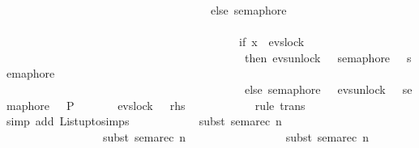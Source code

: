 \begin{isabellebody}
\ \ \ \ \ \ \ \ \ \ \ \ \ \ \ \ \ \ \ \ \ \ \ \ \ \ \ \ \ \ \ \ \ \ \ \ else\ semaphore\ {}\ \isanewline
\ \ \ \ \ \ \ \ \ \ \ \ \ \ \ \ \ \ \ \ \ \ \ \ \ \ \ \ \ \ \ \ \ \ \ \ \ \ \ \ \ {\isacharbar}{\kern0pt}{\isacharbar}{\kern0pt}{\isacharbar}{\kern0pt}\ \isanewline
\ \ \ \ \ \ \ \ \ \ \ \ \ \ \ \ \ \ \ \ \ \ \ \ \ \ \ \ \ \ \ \ \ \ \ \ \ \ \ \ \ {\isacharparenleft}{\kern0pt}if\ x\ {\isacharequal}{\kern0pt}\ evs{\isachardot}{\kern0pt}lock\ {}\ \isanewline
\ \ \ \ \ \ \ \ \ \ \ \ \ \ \ \ \ \ \ \ \ \ \ \ \ \ \ \ \ \ \ \ \ \ \ \ \ \ \ \ \ \ then\ evs{\isachardot}{\kern0pt}unlock\ {}\ {\isasymrightarrow}\ semaphore\ {}\ {\isacharbar}{\kern0pt}{\isacharbar}{\kern0pt}{\isacharbar}{\kern0pt}\ semaphore\ {}\isanewline
\ \ \ \ \ \ \ \ \ \ \ \ \ \ \ \ \ \ \ \ \ \ \ \ \ \ \ \ \ \ \ \ \ \ \ \ \ \ \ \ \ \ else\ semaphore\ {}\ {\isacharbar}{\kern0pt}{\isacharbar}{\kern0pt}{\isacharbar}{\kern0pt}\ evs{\isachardot}{\kern0pt}unlock\ {}\ {\isasymrightarrow}\ semaphore\ {}{\isacharparenright}{\kern0pt}{\isacharparenright}{\kern0pt}{\isacharparenright}{\kern0pt}\ {\isacharbar}{\kern0pt}{\isacharbar}{\kern0pt}\ P{\isacharparenright}{\kern0pt}{\isachardoublequoteclose}\isanewline
\ \ \ \ {\isacharparenleft}{\kern0pt}\ {\isachardoublequoteopen}{\isacharunderscore}{\kern0pt}\ {\isacharequal}{\kern0pt}\ evs{\isachardot}{\kern0pt}lock\ {}\ {\isasymrightarrow}\ {\isacharquery}{\kern0pt}rhs{\isacharprime}{\kern0pt}{\isachardoublequoteclose}{\isacharparenright}{\kern0pt}\isanewline
\ \ \ \ \ \ \ \ \ \ \ \isamarkupfalse%
{\isacharparenleft}{\kern0pt}rule\ trans{\isacharparenright}{\kern0pt}\isanewline
\ \ \ \ \ \ \ \ \ \ \ \isamarkupfalse%
{\isacharparenleft}{\kern0pt}simp\ add{\isacharcolon}{\kern0pt}\ List{\isachardot}{\kern0pt}upto{\isachardot}{\kern0pt}simps{\isacharparenright}{\kern0pt}\isanewline
\ \ \ \ \ \ \ \ \ \ \ \isamarkupfalse%
{\isacharparenleft}{\kern0pt}subst\ sema{\isacharunderscore}{\kern0pt}rec{\isacharbrackleft}{\kern0pt}\ n{\isacharequal}{\kern0pt}{\isacartoucheopen}{}{\isacartoucheclose}{\isacharbrackright}{\kern0pt}{\isacharcomma}{\kern0pt}\isanewline
\ \ \ \ \ \ \ \ \ \ \ \ \ \ \ \ \ subst\ sema{\isacharunderscore}{\kern0pt}rec{\isacharbrackleft}{\kern0pt}\ n{\isacharequal}{\kern0pt}{\isacartoucheopen}{}{\isacartoucheclose}{\isacharbrackright}{\kern0pt}{\isacharcomma}{\kern0pt}\isanewline
\ \ \ \ \ \ \ \ \ \ \ \ \ \ \ \ \ subst\ sema{\isacharunderscore}{\kern0pt}rec{\isacharbrackleft}{\kern0pt}\ n{\isacharequal}{\kern0pt}{\isacartoucheopen}{}{\isacartoucheclose}{\isacharbrackright}{\kern0pt}{\isacharcomma}{\kern0pt}\isanewline

\end{isabellebody}
